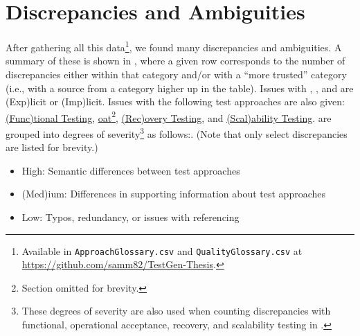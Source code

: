 \section{Discrepancies and Ambiguities}
\label{discrep}


After gathering all this data\footnote{Available in \texttt{ApproachGlossary.csv}
      and \texttt{QualityGlossary.csv} at 
      {\url{https://github.com/samm82/TestGen-Thesis}}.}, we found many discrepancies
and ambiguities. A summary of these is shown in
, where a given row corresponds to the number of
discrepancies either within that category and/or with a ``more trusted''
category (i.e., with a source from a category higher up in the table). Issues
with , , and  are
(Exp)licit or (Imp)licit. Issues with the following test approaches are also
given: \hyperref[func-test-discrep]{(Func)tional Testing},
\hyperref[oat-discrep]{\acf{oat}\ifnotpaper\else\footnote{Section omitted for
                  brevity.}\fi}, \hyperref[recov-discrep]{(Rec)overy Testing},
and \hyperref[scal-discrep]{(Scal)ability Testing}. 
are grouped into degrees of severity\footnote{These degrees of severity are
      also used when counting discrepancies with functional, operational
      acceptance, recovery, and scalability testing in .}
as follows\ifnotpaper:\else.
(Note that only select discrepancies are listed for brevity.) \fi

\begin{itemize}
      \item High: Semantic differences between test approaches
      \item (Med)ium: Differences in supporting information about test approaches
      \item Low: Typos, redundancy, or issues with referencing
\end{itemize}

\ifnotpaper  \fi


